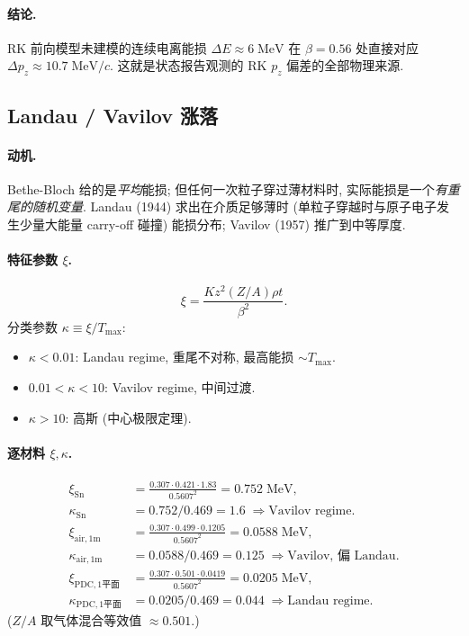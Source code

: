 \paragraph{结论.} RK 前向模型未建模的连续电离能损 $\Delta E \approx 6\;\mathrm{MeV}$ 在 $\beta = 0.56$ 处直接对应 $\Delta p_z \approx 10.7\;\mathrm{MeV}/c$. 这就是状态报告观测的 RK $p_z$ 偏差的全部物理来源.

\subsection{Landau / Vavilov 涨落}

\paragraph{动机.} Bethe-Bloch 给的是\emph{平均}能损; 但任何一次粒子穿过薄材料时, 实际能损是一个\emph{有重尾的随机变量}. Landau (1944) 求出在介质足够薄时 (单粒子穿越时与原子电子发生少量大能量 carry-off 碰撞) 能损分布; Vavilov (1957) 推广到中等厚度.

\paragraph{特征参数 $\xi$.}
\begin{equation}
  \xi = \frac{K z^2 (Z/A) \rho t}{\beta^2}.
  \label{eq:partIc:xi}
\end{equation}
分类参数 $\kappa \equiv \xi / T_\mathrm{max}$:
\begin{itemize}[nosep, leftmargin=2em]
  \item $\kappa < 0.01$: Landau regime, 重尾不对称, 最高能损 $\sim T_\mathrm{max}$.
  \item $0.01 < \kappa < 10$: Vavilov regime, 中间过渡.
  \item $\kappa > 10$: 高斯 (中心极限定理).
\end{itemize}

\paragraph{逐材料 $\xi, \kappa$.}
\begin{align}
  \xi_\mathrm{Sn} &= \frac{0.307 \cdot 0.421 \cdot 1.83}{0.5607^2} = 0.752\;\mathrm{MeV}, \\
  \kappa_\mathrm{Sn} &= 0.752 / 0.469 = 1.6 \;\Rightarrow \text{Vavilov regime.} \\
  \xi_\mathrm{air,1m} &= \frac{0.307 \cdot 0.499 \cdot 0.1205}{0.5607^2}
  = 0.0588\;\mathrm{MeV}, \\
  \kappa_\mathrm{air,1m} &= 0.0588 / 0.469 = 0.125 \;\Rightarrow \text{Vavilov, 偏 Landau.} \\
  \xi_\mathrm{PDC,1平面} &= \frac{0.307 \cdot 0.501 \cdot 0.0419}{0.5607^2}
  = 0.0205\;\mathrm{MeV}, \\
  \kappa_\mathrm{PDC,1平面} &= 0.0205/0.469 = 0.044 \;\Rightarrow \text{Landau regime.}
\end{align}
($Z/A$ 取气体混合等效值 $\approx 0.501$.)

